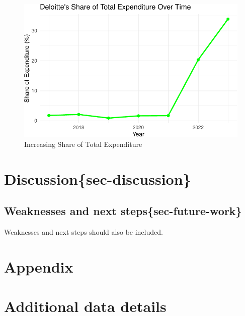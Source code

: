 \documentclass[
  letterpaper,
  DIV=11,
  numbers=noendperiod]{scrartcl}
\begin{document}
\begin{figure}[H]

{\centering \includegraphics{paper_files/figure-pdf/increasing-share-proof-2.pdf}

}

\caption{Increasing Share of Total Expenditure}

\end{figure}%

\section{Discussion\{sec-discussion\}}\label{discussionsec-discussion}

\subsection{Weaknesses and next
steps\{sec-future-work\}}\label{weaknesses-and-next-stepssec-future-work}

Weaknesses and next steps should also be included.

\newpage

\appendix

\section*{Appendix}\label{appendix}

\section{Additional data details}\label{additional-data-details}

\newpage
\end{document}
